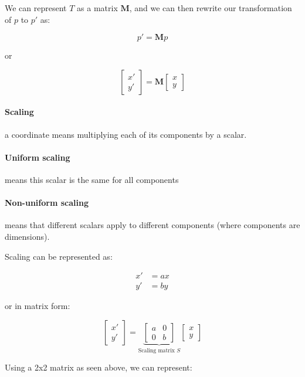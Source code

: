\documentclass{article}
\begin{document}
We can represent $T$ as a matrix $\mathbf{M}$, and we can then rewrite our transformation of $p$ to $p'$ as:

\[
  p' = \mathbf{M} p
\]

or

\[
  \begin{bmatrix}
    x' \\ y'
  \end{bmatrix} =
  \mathbf{M} \begin{bmatrix}
    x \\ y
  \end{bmatrix}
\]

\paragraph{Scaling} a coordinate means multiplying each of its components by a scalar.

\paragraph{Uniform scaling} means this scalar is the same for all components

\paragraph{Non-uniform scaling} means that different scalars apply to different components (where components are dimensions).

Scaling can be represented as:

\begin{align*}
  x' &= ax \\
  y' &= by
\end{align*}

or in matrix form:

\[
  \begin{bmatrix}
    x'\\ y'
  \end{bmatrix} =
  \underbrace{\begin{bmatrix}
    a & 0 \\
    0 & b
  \end{bmatrix}}_{\text{Scaling matrix $S$}}\begin{bmatrix}
    x \\ y
  \end{bmatrix}
\]

Using a 2x2 matrix as seen above, we can represent:
\end{document}
